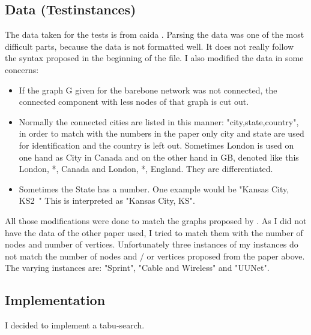 \documentclass [12pt]{article}
\begin{document}
\subsection{Data (Testinstances)}
The data taken for the tests is from caida \cite{caidabarebones}. Parsing the
data was one of the most difficult parts, because the data is not formatted well.
It does not really follow the syntax proposed in the beginning of the file. I also
modified the data in some concerns:
\begin{itemize}
    \item If the graph G given for the barebone network was not connected,
        the connected component with less nodes of that graph is cut out.

    \item Normally the connected cities are listed in this manner:
        "city,state,country", in order to match with the numbers 
        in the paper \cite{mirrorserver} only city and state are used for
        identification and the country is left out. Sometimes London
        is used on one hand as City in Canada and on the other hand in GB, denoted like this
        London, *, Canada and London, *, England. They are differentiated.
    \item Sometimes the State has a number. One example would be "Kansas City, KS2~"
        This is interpreted as "Kansas City, KS".

\end{itemize}

All those modifications were done to match the graphs proposed by \cite{mirrorserver}.
As I did not have the data of the other paper used, I tried to match them with the number of
nodes and number of vertices. Unfortunately three instances of my instances do not
match the number of nodes and / or vertices proposed from the paper above.
The varying instances are: "Sprint", "Cable and Wireless" and "UUNet".

\subsection{Implementation}
I decided to implement a tabu-search.
\end{document}
